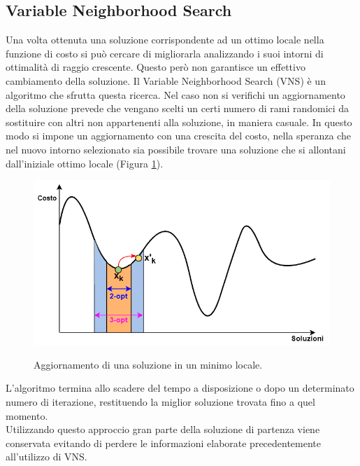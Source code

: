 \subsection{Variable Neighborhood Search \cite{VNS}}
Una volta ottenuta una soluzione corrispondente ad un ottimo locale nella funzione di costo si può cercare di migliorarla analizzando i suoi intorni di ottimalità di raggio crescente. Questo però non garantisce un effettivo cambiamento della soluzione. Il Variable Neighborhood Search (VNS) è un algoritmo che sfrutta questa ricerca. Nel caso non si verifichi un aggiornamento della soluzione prevede che vengano scelti un certi numero di rami randomici da sostituire con altri non appartenenti alla soluzione, in maniera casuale. In questo modo si impone un aggiornamento con una crescita del costo, nella speranza che nel nuovo intorno selezionato sia possibile trovare una soluzione che si allontani dall'iniziale ottimo locale (Figura \ref{VNS}).\\
 \begin{figure}[H] 
\begin{center} 
  \includegraphics[scale=0.5]{Images/VNS_bianco}\\ 
  \caption{\footnotesize{Aggiornamento di una soluzione in un minimo locale.}}
  \label{VNS}
\end{center}
\end{figure}
L'algoritmo termina allo scadere del tempo a disposizione o dopo un determinato numero di iterazione, restituendo la miglior soluzione trovata fino a quel momento.\\
Utilizzando questo approccio gran parte della soluzione di partenza viene conservata evitando di perdere le informazioni elaborate precedentemente all'utilizzo di VNS.
